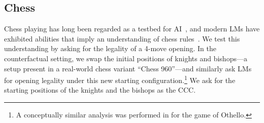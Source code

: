 \vspace{-1mm}
\subsection{Chess}
\vspace{-1mm}
Chess playing has long been regarded as a testbed for AI~\cite{DBLP:journals/corr/abs-1712-01815,DBLP:journals/corr/abs-2009-04374}, and modern LMs have exhibited abilities that imply an understanding of chess rules~\cite{srivastava2023imitation,du2023improving}.
We test this understanding by asking for the legality of a 4-move opening. In the counterfactual setting, we swap the initial positions of knights and bishops---a setup present in a real-world chess variant ``Chess 960''---and similarly ask LMs for opening legality under this new starting configuration.\footnote{A conceptually similar analysis was performed in \citet{li2023emergent} for the game of Othello.} 
We ask for the starting positions of the knights and the bishops as the CCC.


